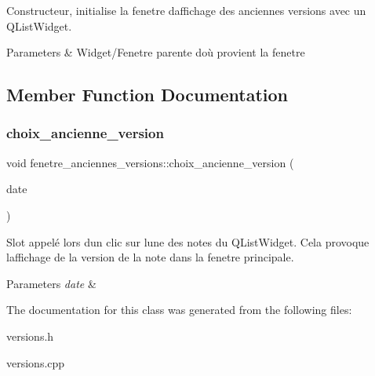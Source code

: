 Constructeur, initialise la fenetre d\textquotesingle{}affichage des anciennes versions avec un Q\+List\+Widget. 


\begin{DoxyParams}{Parameters}
{\em } & Widget/\+Fenetre parente d\textquotesingle{}où provient la fenetre \\
\hline
\end{DoxyParams}


\subsection{Member Function Documentation}
\mbox{\label{classfenetre__anciennes__versions_aff29c8425f322a7e82c950bc77f5ce6d}} 
\subsubsection{\texorpdfstring{choix\+\_\+ancienne\+\_\+version}{choix\_ancienne\_version}}
{\footnotesize\ttfamily void fenetre\+\_\+anciennes\+\_\+versions\+::choix\+\_\+ancienne\+\_\+version (\begin{DoxyParamCaption}\item[{Q\+String}]{date }\end{DoxyParamCaption})\hspace{0.3cm}{\ttfamily [slot]}}



Slot appelé lors d\textquotesingle{}un clic sur l\textquotesingle{}une des notes du Q\+List\+Widget. Cela provoque l\textquotesingle{}affichage de la version de la note dans la fenetre principale. 


\begin{DoxyParams}{Parameters}
{\em date} & \\
\hline
\end{DoxyParams}


The documentation for this class was generated from the following files\+:\begin{DoxyCompactItemize}
\item 
versions.\+h\item 
versions.\+cpp\end{DoxyCompactItemize}
